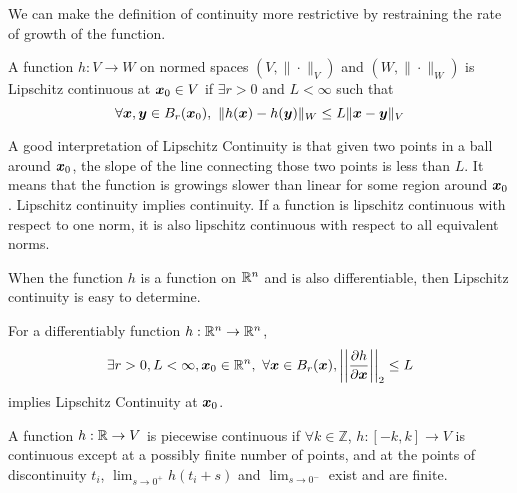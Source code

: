 We can make the definition of continuity more restrictive by restraining the
rate of growth of the function.
\begin{definition}
	A function $h:V\to W$ on normed spaces $(V, \|\cdot\|_V)$ and $(W,
	\|\cdot\|_W)$ is Lipschitz continuous at $\boldsymbol{x}_0\in V$ if $\exists r > 0$
	and $L < \infty$ such that \[
		\forall \boldsymbol{x}, \boldsymbol{y}\in B_r(\boldsymbol{x}_0),\ \|h(\boldsymbol{x}) - h(\boldsymbol{y})\|_W \leq L
		\|\boldsymbol{x} - \boldsymbol{y}\|_V
	\]
	\label{defn:lipschitz-continuity}
\end{definition}
A good interpretation of Lipschitz Continuity is that given two points in a ball
around $\boldsymbol{x}_0$, the slope of the line connecting those two points is less
than $L$. It means that the function is growings slower than linear for some
region around $\boldsymbol{x}_0$. Lipschitz continuity implies continuity. If a function
is lipschitz continuous with respect to one norm, it is also lipschitz
continuous with respect to all equivalent norms.

When the function $h$ is a function on $\mathbb{R}^n$ and is also
differentiable, then Lipschitz continuity is easy to determine.
\begin{theorem}
	For a differentiably function $h:\mathbb{R}^n\to\mathbb{R}^n$, \[
		\exists r>0, L < \infty, \bs{x}_0\in\R^n,\ \forall \bs{x}\in B_r(\bs{x}),
		\left\lvert\left\lvert\frac{\partial h}{\partial
		\bs{x}}\right\rvert\right\rvert_2 \leq L
	\] implies Lipschitz Continuity at $\boldsymbol{x}_0$.
	\label{thm:differentiable-lipschitz}
\end{theorem}
\begin{definition}
	A function $h:\mathbb{R}\to V$ is piecewise continuous if $\forall k\in \mathbb{Z}$,
	$h:[-k, k] \to V$ is continuous except at a possibly finite number of points,
	and at the points of discontinuity $t_i$, $\lim_{s\to0^+} h(t_i+s)$ and
	$\lim_{s\to0^-}$ exist and are finite. 
	\label{defn:piecewise-continuous}
\end{definition}
